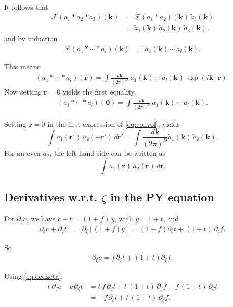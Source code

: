 \documentclass[preprint]{revtex4-1}
\numberwithin{equation}{subsection}
\numberwithin{table}{section}
\newcommand{\vct}[1]{\mathbf{#1}}
\providecommand{\vr}{} %
\renewcommand{\vr}{\vct{r}}
\newcommand{\vk}{\vct{k}}
\newcommand{\dvk}{\frac{d\vk}{(2\pi)^D}}
\newcommand{\FT}{\mathscr{F}}
\begin{document}
It follows that
\begin{align*}
  \FT(a_1 * a_2 * a_3)(\vk)
&= \FT(a_1 * a_2)(\vk) \, \tilde{a}_3(\vk)
  \\
&= \tilde{a}_1(\vk) \, \tilde{a}_2(\vk) \, \tilde{a}_3(\vk).
\end{align*}
and by induction
\begin{align*}
  \FT(a_1 * \cdots * a_l)(\vk)
&= \tilde{a}_1(\vk) \, \cdots \, \tilde{a}_l(\vk).
\end{align*}

This means
\begin{align*}
  (a_1 * \cdots * a_l)(\vr)
= \int \dvk \, \tilde{a}_1(\vk) \, \cdots \, \tilde{a}_l(\vk)
  \, \exp(i\vk\cdot\vr).
\end{align*}
%
Now setting $\vr = 0$ yields the first equality.
\begin{align*}
  (a_1 * \cdots * a_l)(\vct 0)
= \int \dvk \, \tilde{a}_1(\vk) \, \cdots \, \tilde{a}_l(\vk).
\end{align*}

Setting $\vr = 0$ in the first expression of \eqref{eq:convol}, yields
\[
  \int a_1(\vr') \, a_2(-\vr') \, d\vr'
= \int \dvk \tilde{a}_1(\vk) \, \tilde{a}_2(\vk).
\]
For an even $a_2$,
the left hand side can be written as
\[
  \int a_1(\vr) \, a_2(\vr) \, d\vr.
\]



\subsection{Derivatives w.r.t. $\zeta$ in the PY equation}



For $\partial_\zeta c$,
we have $c + t = (1 + f) \, y$,
with $y = 1 + t$,
and
\begin{align*}
\partial_\zeta c
+ \partial_\zeta t
&= \partial_\zeta [(1+f)y]
=
(1 + f) \partial_\zeta t
+ (1 + t) \, \partial_\zeta f.
\end{align*}

So
\begin{align}
\partial_\zeta c
=
f \, \partial_\zeta t
+ (1+t) \partial_\zeta f.
\label{eq:dcdzeta}
\end{align}

Using \eqref{eq:dcdzeta},
\begin{align*}
  t\, \partial_\zeta c - c \, \partial_\zeta t
&=
  t \, f \, \partial_\zeta t
+ t \, (1 + t) \, \partial_\zeta f
- f \, (1 + t) \, \partial_\zeta t
\\
&=
- f \, \partial_\zeta t
+ t \, (1 + t) \, \partial_\zeta f.
\end{align*}
\end{document}
